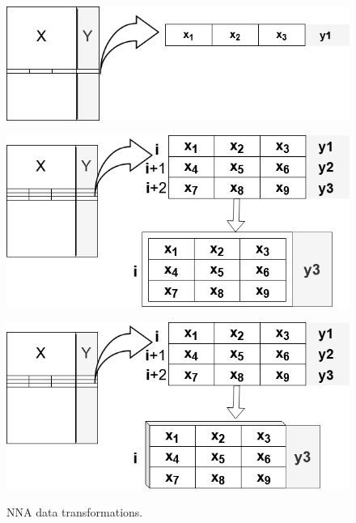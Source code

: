 \documentclass[a4paper,fleqn]{cas-sc}
\begin{document}
\begin{figure}[!htb]
	\centering
	\begin{minipage}{0.32\textwidth}
		{\includegraphics[width=\textwidth]{figs/transformacao_dados_MLP.png}}
		\label{fig:transformacao_mlp}
	\end{minipage}
	\hfill
	\begin{minipage}{0.34\textwidth}
		{\includegraphics[width=\textwidth]{figs/transformacao_dados_LSTM.png}}
		\label{fig:transformacao_LSTM}
	\end{minipage}
	\hfill
	\begin{minipage}{0.32\textwidth}
		{\includegraphics[width=\textwidth]{figs/transformacao_dados_CNN.png}}
		\label{fig:transformacao_CNN}
	\end{minipage}
	\caption{NNA data transformations.}
	\label{fig:desempenhogeneralizacao}
\end{figure}
\end{document}
